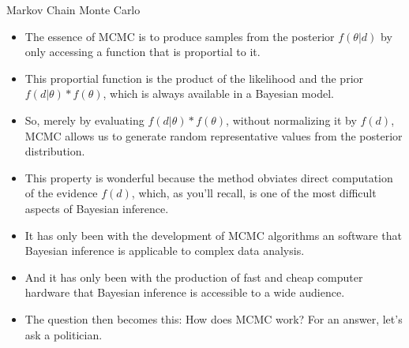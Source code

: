 \documentclass[handout]{beamer}
\begin{document}
\begin{frame}{Markov Chain Monte Carlo}
\scriptsize{
\begin{itemize}
\item The essence of MCMC is to produce samples from the posterior $f(\theta|d)$ by only accessing a function that is proportial to it.
\item This proportial function is the product of the likelihood and the prior $f(d|\theta)*f(\theta)$, which is always available in a Bayesian model.
\item So, merely by evaluating $f(d|\theta)*f(\theta)$, without normalizing it by $f(d)$, MCMC allows us to generate random representative values from the posterior distribution.

\item This property is wonderful because the method obviates direct computation of the evidence $f(d)$, which, as you'll recall, is one of the most difficult aspects of Bayesian
inference. 

\item It has only been with the development of MCMC algorithms an software that Bayesian inference is applicable to complex data analysis.
\item And it has only been with the production of fast and cheap computer hardware that Bayesian inference is accessible to a wide audience.

\item The question then becomes this: How does MCMC work? For an answer, let's ask a politician. 
 
\end{itemize}



} 

\end{frame}
\end{document}
